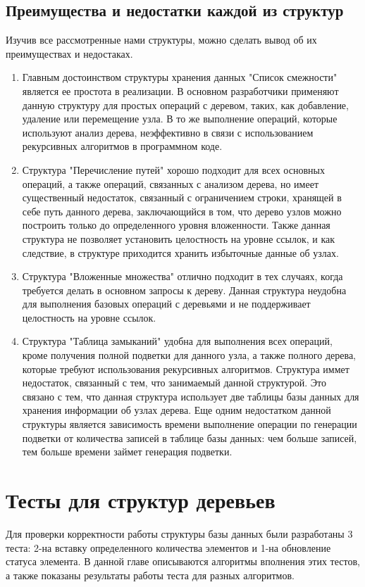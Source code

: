 \documentclass[a4paper,14pt]{extreport}
\theoremstyle{definition}
\begin{document}
\section{Преимущества и недостатки каждой из структур}
Изучив все рассмотренные нами структуры, можно сделать вывод об их преимуществах и недостаках\cite{Karwin,VanTulder}.
\begin{enumerate}
\item Главным достоинством структуры хранения данных "Список смежности" является ее простота в реализации. В основном разработчики применяют данную структуру для простых операций с деревом, таких, как добавление, удаление или перемещение узла. В то же выполнение операций, которые используют анализ дерева, неэффективно в связи с использованием рекурсивных алгоритмов в программном коде.
\item Структура "Перечисление путей" хорошо подходит для всех основных операций, а также операций, связанных с анализом дерева, но имеет существенный недостаток, связанный с ограничением строки, хранящей в себе путь данного дерева, заключающийся в том, что дерево узлов можно построить только до определенного уровня вложенности. Также данная структура не позволяет установить целостность на уровне ссылок, и как следствие, в структуре приходится хранить избыточные данные об узлах.
\item Структура "Вложенные множества" отлично подходит в тех случаях, когда требуется делать в основном запросы к дереву. Данная структура неудобна для выполнения базовых операций с деревьями и не поддерживает целостность на уровне ссылок.
\item Структура "Таблица замыканий" удобна для выполнения всех операций, кроме получения полной подветки для данного узла, а также полного дерева, которые требуют использования рекурсивных алгоритмов. Структура иммет недостаток, связанный с тем, что занимаемый данной структурой. Это связано с тем, что данная структура использует две таблицы базы данных для хранения информации об узлах дерева. Еще одним недостатком данной структуры является зависимость времени выполнение операции по генерации подветки от количества записей в таблице базы данных: чем больше записей, тем больше времени займет генерация подветки.
\end{enumerate}
\chapter{Тесты для структур деревьев}
Для проверки корректности работы структуры базы данных были разработаны 3 теста: 2-на вставку определенного количества элементов и 1-на обновление статуса элемента. В данной главе описываются алгоритмы вполнения этих тестов, а также показаны результаты работы теста для разных алгоритмов.
\end{document}
